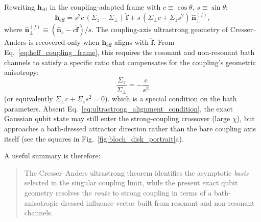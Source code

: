Rewriting $\mathbf h_{\mathrm{eff}}$ in the coupling-adapted frame with
$c\equiv \cos\theta$, $s\equiv \sin\theta$:
\begin{equation}
\mathbf h_{\mathrm{eff}}
=
s^2 c\,(\Sigma_z - \Sigma_\perp)\,\hat{\mathbf f}
+
s\,(\Sigma_\perp c + \Sigma_z s^2)\,\hat{\mathbf n}^{(f)}_\perp ,
\label{eq:heff_coupling_frame}
\end{equation}
where $\hat{\mathbf n}^{(f)}_\perp \equiv (\hat{\mathbf{n}}_s-c\hat{\mathbf f})/s$.
The coupling-axis ultrastrong geometry of Cresser--Anders is recovered only when $\mathbf h_{\mathrm{eff}}$ aligns with $\hat{\mathbf f}$. From Eq.~\eqref{eq:heff_coupling_frame}, this requires the resonant and non-resonant bath channels to satisfy a specific ratio that compensates for the coupling's geometric anisotropy:
\begin{equation}
\frac{\Sigma_z}{\Sigma_\perp} = -\frac{c}{s^2}
\label{eq:ultrastrong_alignment_condition}
\end{equation}
(or equivalently $\Sigma_\perp c + \Sigma_z s^2 = 0$).
which is a special condition on the bath parameters. Absent
Eq.~\eqref{eq:ultrastrong_alignment_condition}, the exact Gaussian qubit state
may still enter the strong-coupling crossover (large $\chi$), but approaches a
bath-dressed attractor direction rather than the bare coupling axis itself (see
the squares in Fig.~\ref{fig:bloch_disk_portrait}a).

A useful summary is therefore:
\begin{quote}
The Cresser--Anders ultrastrong theorem identifies the asymptotic \emph{basis}
selected in the singular coupling limit, while the present exact qubit geometry
resolves the \emph{route} to strong coupling in terms of a bath-anisotropic
dressed influence vector built from resonant and non-resonant channels.
\end{quote}
